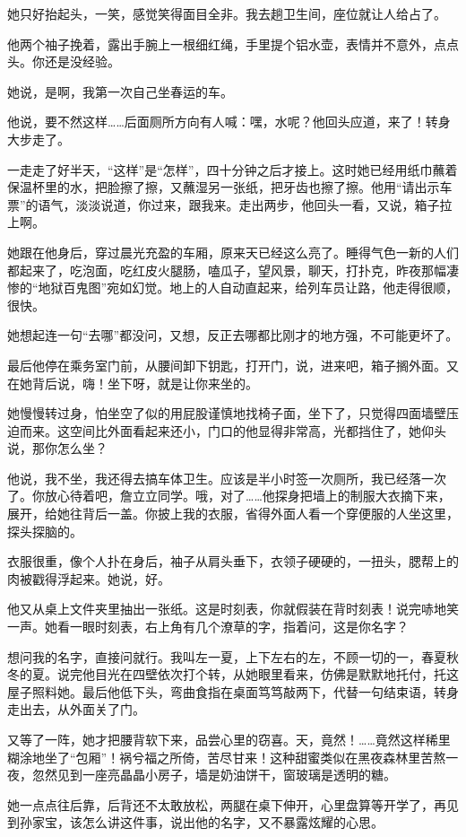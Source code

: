 \documentclass[lang=cn,newtx,12pt,scheme=chinese]{elegantbook}
\begin{document}
她只好抬起头，一笑，感觉笑得面目全非。我去趟卫生间，座位就让人给占了。

他两个袖子挽着，露出手腕上一根细红绳，手里提个铝水壶，表情并不意外，点点头。你还是没经验。

她说，是啊，我第一次自己坐春运的车。

他说，要不然这样……后面厕所方向有人喊：嘿，水呢？他回头应道，来了！转身大步走了。

一走走了好半天，“这样”是“怎样”，四十分钟之后才接上。这时她已经用纸巾蘸着保温杯里的水，把脸擦了擦，又蘸湿另一张纸，把牙齿也擦了擦。他用“请出示车票”的语气，淡淡说道，你过来，跟我来。走出两步，他回头一看，又说，箱子拉上啊。

她跟在他身后，穿过晨光充盈的车厢，原来天已经这么亮了。睡得气色一新的人们都起来了，吃泡面，吃红皮火腿肠，嗑瓜子，望风景，聊天，打扑克，昨夜那幅凄惨的“地狱百鬼图”宛如幻觉。地上的人自动直起来，给列车员让路，他走得很顺，很快。

她想起连一句“去哪”都没问，又想，反正去哪都比刚才的地方强，不可能更坏了。

最后他停在乘务室门前，从腰间卸下钥匙，打开门，说，进来吧，箱子搁外面。又在她背后说，嗨！坐下呀，就是让你来坐的。

她慢慢转过身，怕坐空了似的用屁股谨慎地找椅子面，坐下了，只觉得四面墙壁压迫而来。这空间比外面看起来还小，门口的他显得非常高，光都挡住了，她仰头说，那你怎么坐？

他说，我不坐，我还得去搞车体卫生。应该是半小时签一次厕所，我已经落一次了。你放心待着吧，詹立立同学。哦，对了……他探身把墙上的制服大衣摘下来，展开，给她往背后一盖。你披上我的衣服，省得外面人看一个穿便服的人坐这里，探头探脑的。

衣服很重，像个人扑在身后，袖子从肩头垂下，衣领子硬硬的，一扭头，腮帮上的肉被戳得浮起来。她说，好。

他又从桌上文件夹里抽出一张纸。这是时刻表，你就假装在背时刻表！说完哧地笑一声。她看一眼时刻表，右上角有几个潦草的字，指着问，这是你名字？

想问我的名字，直接问就行。我叫左一夏，上下左右的左，不顾一切的一，春夏秋冬的夏。说完他目光在四壁依次打个转，从她眼里看来，仿佛是默默地托付，托这屋子照料她。最后他低下头，弯曲食指在桌面笃笃敲两下，代替一句结束语，转身走出去，从外面关了门。

又等了一阵，她才把腰背软下来，品尝心里的窃喜。天，竟然！……竟然这样稀里糊涂地坐了“包厢”！祸兮福之所倚，苦尽甘来！这种甜蜜类似在黑夜森林里苦熬一夜，忽然见到一座亮晶晶小房子，墙是奶油饼干，窗玻璃是透明的糖。

她一点点往后靠，后背还不太敢放松，两腿在桌下伸开，心里盘算等开学了，再见到孙家宝，该怎么讲这件事，说出他的名字，又不暴露炫耀的心思。
\end{document}
